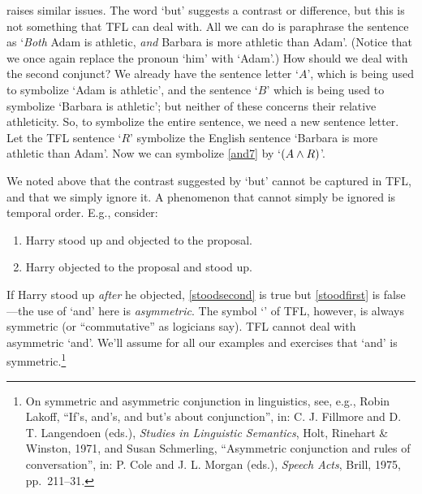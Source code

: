  raises similar issues. The word `but' suggests a contrast
or difference, but this is not something that TFL can deal with. All
we can do is paraphrase the sentence as `\emph{Both} Adam is athletic,
\emph{and} Barbara is more athletic than Adam'. (Notice that we once
again replace the pronoun `him' with `Adam'.) How should we deal with
the second conjunct? We already have the sentence letter `$A$', which
is being used to symbolize `Adam is athletic', and the sentence `$B$'
which is being used to symbolize `Barbara is athletic'; but neither of
these concerns their relative athleticity. So, to symbolize the entire
sentence, we need a new sentence letter. Let the TFL sentence `$R$'
symbolize the English sentence `Barbara is more athletic than Adam'.
Now we can symbolize \cref*{and7} by `$(A \wedge R)$'. 

We noted above that the contrast suggested by `but' cannot be captured
in TFL, and that we simply ignore it. A phenomenon that cannot simply
be ignored is temporal order. E.g., consider:
\begin{enumerate}
	\item\label{stoodfirst} Harry stood up and objected to the proposal.
	\item\label{stoodsecond} Harry objected to the proposal and stood up.
\end{enumerate}
If Harry stood up \emph{after} he objected, \cref*{stoodsecond} is true
but \cref*{stoodfirst} is false---the use of `and' here is
\emph{asymmetric}. The symbol `\eand' of TFL, however, is always
symmetric (or ``commutative'' as logicians say). TFL cannot deal with
asymmetric `and'. We'll assume for all our examples and exercises
that `and' is symmetric.\footnote{On symmetric and asymmetric
conjunction in linguistics, see, e.g., Robin Lakoff, ``If's,
and's, and but's about conjunction'', in: C. J. Fillmore and D. T.
Langendoen (eds.), \textit{Studies in Linguistic Semantics}, 
Holt, Rinehart \& Winston, 1971, and Susan Schmerling, ``Asymmetric
conjunction and rules of conversation'', in: P. Cole and J. L.
Morgan (eds.), \textit{Speech Acts}, Brill, 1975, pp.~211--31.}

